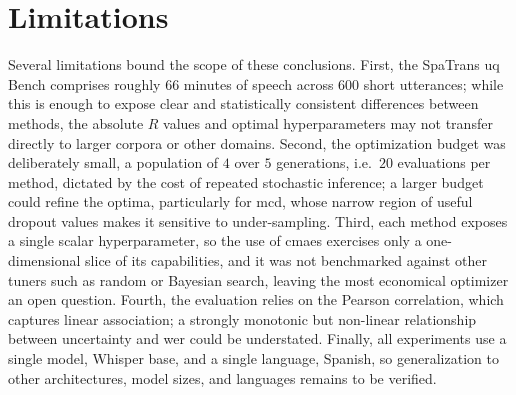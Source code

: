 \section{Limitations}

Several limitations bound the scope of these conclusions. First, the SpaTrans \acrshort{uq} Bench comprises roughly 66 minutes of speech across 600 short utterances; while this is enough to expose clear and statistically consistent differences between methods, the absolute $R$ values and optimal hyperparameters may not transfer directly to larger corpora or other domains. Second, the optimization budget was deliberately small, a population of $4$ over $5$ generations, i.e.\ $20$ evaluations per method, dictated by the cost of repeated stochastic inference; a larger budget could refine the optima, particularly for \acrshort{mcd}, whose narrow region of useful dropout values makes it sensitive to under-sampling. Third, each method exposes a single scalar hyperparameter, so the use of \acrshort{cmaes} exercises only a one-dimensional slice of its capabilities, and it was not benchmarked against other tuners such as random \cite{bergstra2012random} or Bayesian \cite{snoek2012practical} search, leaving the most economical optimizer an open question. Fourth, the evaluation relies on the Pearson correlation, which captures linear association; a strongly monotonic but non-linear relationship between uncertainty and \acrshort{wer} could be understated. Finally, all experiments use a single model, Whisper base, and a single language, Spanish, so generalization to other architectures, model sizes, and languages remains to be verified.


